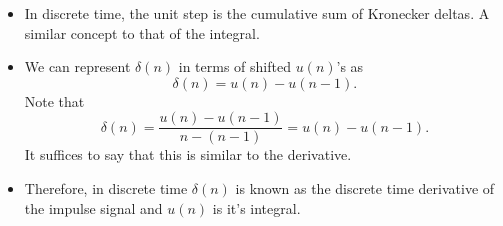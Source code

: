 \begin{itemize}
	\item In discrete time, the unit step is the cumulative sum of Kronecker
	      deltas. A similar concept to that of the integral.
	\item We can represent $\delta(n)$ in terms of shifted $u(n)$'s as
	      \[
		      \delta(n) = u(n) - u(n-1)
		      .\]
	      Note that
	      \[
		      \delta(n) = \frac{u(n) - u(n-1)}{n-(n-1)} = u(n) - u(n-1)
		      .\]
	      It suffices to say that this is similar to the
	      derivative.
	\item Therefore, in discrete time $\delta(n)$ is known as the
	      discrete time derivative of the impulse signal
	      and $u(n)$ is it's integral.
\end{itemize}
